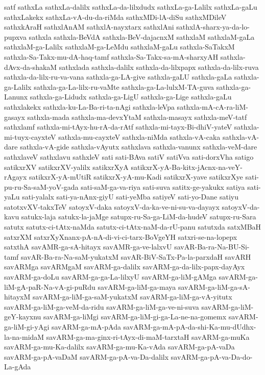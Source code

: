 {satf
sathxLa
sathxLa-dalilx
sathxLa-da-lilxdudx
sathxLa-ga-Lalilx
sathxLa-gaLu
sathxLakekx
sathxLa-vA-du-da-riMda
sathxMDi-lA-diSu
sathxMDileV
sathxkAraH
sathxlAnAM
sathxlA-nayxtarx
sathxlAni
sathxlA-sharx-ya-da-lo-pupxva
sathxla
sathxla-BeVdA
sathxla-BeV-dajacnxM
sathxlaM
sathxlaM-gaLa
sathxlaM-ga-Lalilx
sathxlaM-ga-LeMdu
sathxlaM-gaLu
sathxla-SaTakxM
sathxla-Sa-Takx-mu-dA-haq-tamf
sathxla-Sa-Takx-sa-mA-sharxyAH
sathxla-dAvx-da-shakaM
sathxlada
sathxla-dalilx
sathxla-da-lilxpapx
sathxla-da-lilx-ruva
sathxla-da-lilx-ru-va-vana
sathxla-ga-LA-give
sathxla-gaLU
sathxla-gaLa
sathxla-ga-Lalilx
sathxla-ga-La-lilx-ru-vaMte
sathxla-ga-La-lulxM-TA-guva
sathxla-ga-Lanunx
sathxla-ga-Lidudx
sathxla-ga-LigU
sathxla-ga-Lige
sathxla-gaLu
sathxlakekx
sathxla-ku-La-Ba-ri-ta-nAgi
sathxla-leVpa
sathxla-mA-cA-ra-liM-gasayx
sathxla-mada
sathxla-ma-devxYtaM
sathxla-masayx
sathxla-meV-tatf
sathxlamf
sathxla-mi-tAyx-hu-rA-da-rAtf
sathxla-mi-tayx-Bi-dhiV-yateV
sathxla-mi-tuyx-cayxteV
sathxla-mu-cayxteV
sathxla-niMda
sathxla-vA-caka
sathxla-vA-dare
sathxla-vA-gide
sathxla-vAyutx
sathxlava
sathxla-vanunx
sathxla-veM-dare
sathxlaveV
sathxlavu
sathxleV
sati
sati-BAva
satiV
satiVva
sati-dorxVha
satigo
satikxrXV
satikxrXV-yalilx
satikxrXyA
satikxrX-yA-Ba-kitx-jAcnx-na-veY-rAgayx
satikxrX-yA-mUtiR
satikxrX-yA-mu-Kadi
satikxrX-yave
satikxrXye
sati-pu-ru-Sa-saM-yoV-gada
sati-saM-ga-va-riya
sati-suva
satitx-ge-yakukx
satiya
sati-yaLu
sati-yalalx
sati-ya-nAnx-giyU
sati-yeMba
satiyeV
sati-yo-Dane
satiyu
satotxvXV-takxTeV
satoyxV-daka
satoyxV-da-ka-ve-ni-su-va-dayayx
satoyxV-da-kavu
satukx-laja
satukx-la-jaMge
satupx-ru-Sa-ga-LiM-da-hudeV
satupx-ru-Sara
satutx
satutx-ci-tAtx-naMda
satutx-ci-tAtx-naM-da-rU-panu
satutxda
satxMBaH
satxrXM
satxrXyXnanx-pA-nA-di-vi-ci-tarx-BoVgeYH
satxri-se-na-lopepx
satxthA
savAMR-ga-sA-hitayx
savAMR-ga-ve-lalxvU
savAR-Ba-ra-Na-BU-Si-tamf
savAR-Ba-ra-Na-saM-yukatxM
savAR-BiV-SaTx-Pa-la-parxdaH
savARH
savARMga
savARMgaM
savARM-ga-dalilx
savARM-ga-da-lilx-papx-dayAyx
savARM-ga-doLu
savARM-ga-ga-La-lilxyU
savARM-ga-liM-gAMga
savARM-ga-liM-gA-paR-Na-vA-gi-puRdu
savARM-ga-liM-ga-maya
savARM-ga-liM-ga-sA-hitayxM
savARM-ga-liM-ga-saM-yukatxM
savARM-ga-liM-ga-vA-yitutx
savARM-ga-liM-ga-veM-da-ridu
savARM-ga-liM-ga-ve-ni-suva
savARM-ga-liM-geY-kayxnu
savARM-ga-liMgi
savARM-ga-liM-gi-ga-La-ne-na-gomemx
savARM-ga-liM-gi-yAgi
savARM-ga-mA-pAda
savARM-ga-mA-pA-da-shi-Ka-mu-dUdhx-la-na-midaM
savARM-ga-ma-ginx-ri-tAyx-di-maM-tarxtaH
savARM-ga-muKa
savARM-ga-mu-Ka-dalilx
savARM-ga-mu-Ka-vAda
savARM-ga-pA-vaDa
savARM-ga-pA-vaDaM
savARM-ga-pA-va-Da-dalilx
savARM-ga-pA-va-Da-do-La-gAda
}
